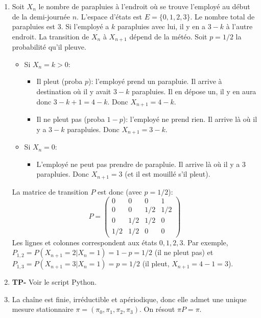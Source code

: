 \documentclass[solutions]{exercices}
\begin{document}
\begin{solution}
	\begin{enumerate}
		\item Soit $X_n$ le nombre de parapluies à l'endroit où se trouve l'employé au début de la demi-journée $n$. L'espace d'états est $E=\{0, 1, 2, 3\}$. Le nombre total de parapluies est 3. Si l'employé a $k$ parapluies avec lui, il y en a $3-k$ à l'autre endroit.
		      La transition de $X_n$ à $X_{n+1}$ dépend de la météo. Soit $p=1/2$ la probabilité qu'il pleuve.
		      \begin{itemize}
			      \item Si $X_n=k > 0$:
			            \begin{itemize}
				            \item Il pleut (proba $p$): l'employé prend un parapluie. Il arrive à destination où il y avait $3-k$ parapluies. Il en dépose un, il y en aura donc $3-k+1 = 4-k$. Donc $X_{n+1}=4-k$.
				            \item Il ne pleut pas (proba $1-p$): l'employé ne prend rien. Il arrive là où il y a $3-k$ parapluies. Donc $X_{n+1}=3-k$.
			            \end{itemize}
			      \item Si $X_n=0$:
			            \begin{itemize}
				            \item L'employé ne peut pas prendre de parapluie. Il arrive là où il y a 3 parapluies. Donc $X_{n+1}=3$ (et il est mouillé s'il pleut).
			            \end{itemize}
		      \end{itemize}
		      La matrice de transition $P$ est donc (avec $p=1/2$):
		      \[ P = \begin{pmatrix}
				      0   & 0   & 0   & 1   \\
				      0   & 0   & 1/2 & 1/2 \\
				      0   & 1/2 & 1/2 & 0   \\
				      1/2 & 1/2 & 0   & 0
			      \end{pmatrix} \]
		      Les lignes et colonnes correspondent aux états $0, 1, 2, 3$. Par exemple, $P_{1,2} = P(X_{n+1}=2|X_n=1) = 1-p = 1/2$ (il ne pleut pas) et $P_{1,3} = P(X_{n+1}=3|X_n=1) = p = 1/2$ (il pleut, $X_{n+1}=4-1=3$).
		\item \textbf{TP-} Voir le script Python.
		\item La chaîne est finie, irréductible et apériodique, donc elle admet une unique mesure stationnaire $\pi = (\pi_0, \pi_1, \pi_2, \pi_3)$. On résout $\pi P = \pi$.

\end{enumerate}
\end{solution}
\end{document}
